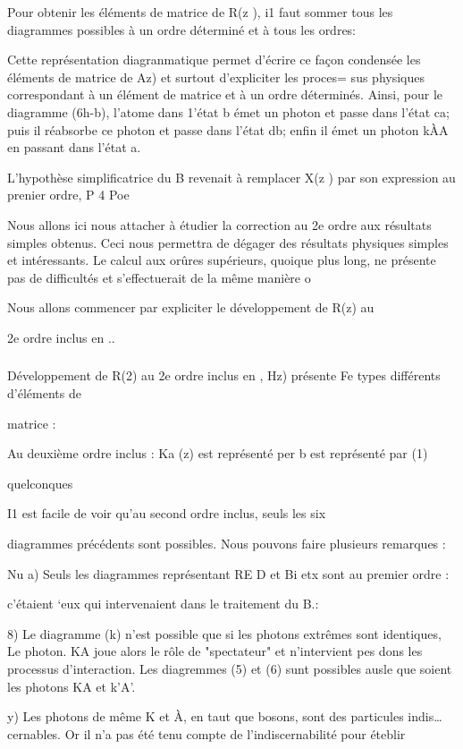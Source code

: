 Pour obtenir les éléments de matrice de R(z ), i1 faut sommer
tous les diagrammes possibles à un ordre déterminé et à tous les ordres:

Cette représentation diagranmatique permet d'écrire ce façon
condensée les éléments de matrice de Az) et surtout d'expliciter les proces=
sus physiques correspondant à un élément de matrice et à un ordre déterminés.
Ainsi, pour le diagramme (6h-b), l'atome dans 1'état b émet un photon
et passe dans l'état ca; puis il réabsorbe ce photon et passe dans l'état
db; enfin il émet un photon kÀA en passant dans l'état a.

L'hypothèse simplificatrice du  B revenait à remplacer X(z )
par son expression au prenier ordre, P 4 Poe

Nous allons ici nous attacher à étudier la correction au 2e
ordre aux résultats simples obtenus. Ceci nous permettra de dégager des résultats physiques simples et intéressants. Le calcul aux orûres supérieurs, quoique
plus long, ne présente pas de difficultés et s'effectuerait de la même manière o

Nous allons commencer par expliciter le développement de R(z) au

2e ordre inclus en ..

\subsubsection{} Développement de R(2) au 2e ordre inclus en ,%
Hz) présente Fe types différents d'éléments de

matrice : 

Au deuxième ordre inclus : Ka
(z) est représenté per
b est représenté par (1)

quelconques

I1 est facile de voir qu'au second ordre inclus, seuls les six

diagrammes précédents sont possibles. Nous pouvons faire plusieurs remarques :

Nu
a) Seuls les diagrammes représentant RE D et Bi etx sont au premier ordre :

c'étaient ‘eux qui intervenaient dans le traitement du  B.:

8) Le diagramme (k) n'est possible que si les photons extrêmes sont identiques,
Le photon. KA joue alors le rôle de "spectateur" et n'intervient pes dons les
processus d'interaction. Les diagremmes (5) et (6) sunt possibles ausle que
soient les photons KA et k'A'.

y) Les photons de même K et À, en taut que bosons, sont des particules indis…
cernables. Or il n'a pas été tenu compte de l'indiscernabilité pour éteblir

